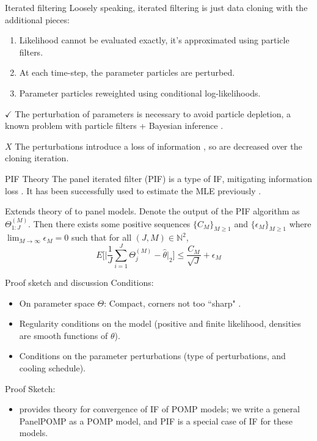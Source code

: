 \documentclass[aspectratio=169]{beamer}\usepackage[]{graphicx}\usepackage[]{xcolor}
\begin{document}
\begin{frame}{Iterated filtering}
  Loosely speaking, iterated filtering is just data cloning with the additional pieces: 
  \begin{enumerate}
    \item Likelihood cannot be evaluated exactly, it's approximated using particle filters. 
    \item At each time-step, the parameter particles are perturbed.
    \item Parameter particles reweighted using conditional log-likelihoods.
  \end{enumerate}\pause
  {\color{green} $\checkmark$} The perturbation of parameters is necessary to avoid particle depletion, a known problem with particle filters + Bayesian inference \citep{chen24}.
  
  {\color{red} $X$} The perturbations introduce a loss of information \citep{liu01}, so are decreased over the cloning iteration.
\end{frame}

\begin{frame}{PIF Theory}
  The panel iterated filter (PIF) is a type of IF, mitigating information loss \citep{breto20}. 
  It has been successfully used to estimate the MLE previously \citep[e.g.,][]{domeyer22}.
  
  \begin{theorem}
    Extends theory of \citet{chen24} to panel models. Denote the output of the PIF algorithm as $\Theta_{1:J}^{(M)}$.
  Then there exists some positive sequences $\{C_M\}_{M \geq 1}$ and $\{\epsilon_M\}_{M \geq 1}$ where $\lim_{M \rightarrow \infty}\epsilon_M = 0$ such that for all $(J, M) \in \mathbb{N}^2$,
  $$
  E\bigg[\Big|\frac{1}{J}\sum_{i=1}^J \Theta_j^{(M)} - \hat{\theta}\Big|_2\bigg] \leq \frac{C_M}{\sqrt{J}} + \epsilon_M
  $$
  \end{theorem}
  
\end{frame}

\begin{frame}{Proof sketch and discussion}
  Conditions:
  \begin{itemize}
    \item On parameter space $\Theta$: Compact, corners not too ``sharp" \citep[regular compact set, Def~1 of][]{chen24}.
    \item Regularity conditions on the model (positive and finite likelihood, densities are smooth functions of $\theta$). 
    \item Conditions on the parameter perturbations (type of perturbations, and cooling schedule). 
  \end{itemize}
  Proof Sketch: 
  \begin{itemize}
    \item \citet{chen24} provides theory for convergence of IF of POMP models; we write a general PanelPOMP as a POMP model, and PIF is a special case of IF for these models. 
  \end{itemize}
\end{frame}
\end{document}
